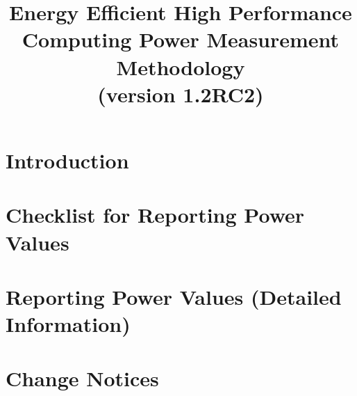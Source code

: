 \documentclass[runningheads]{scrreprt}
\begin{document}
\pagestyle{headings}  %

\title{
Energy Efficient High Performance Computing Power Measurement Methodology \\
\bigskip
\normalsize{(version 1.2RC2)}
}


\date{ }
\maketitle              %

\tableofcontents
\listoftables
\listoffigures

%
\chapter{Introduction}

\label{sec:intro}

\chapter{Checklist for Reporting Power Values}

\label{sec:checklist}

\chapter{Reporting Power Values \normalsize{(Detailed Information)}}

\label{sec:reporting}
\newpage

\chapter{Change Notices}

\label{sec:changenotices}
\end{document}
